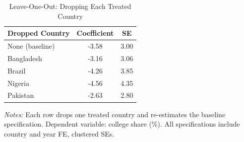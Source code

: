 \begin{table}[t]
\centering
\caption{Leave-One-Out: Dropping Each Treated Country}
\label{tab:loo}
\small
\begin{threeparttable}
\begin{tabular}{lcc}
\toprule
Dropped Country & Coefficient & SE \\
\midrule
None (baseline) & -3.58 & 3.00 \\
Bangladesh & -3.16 & 3.06 \\
Brazil & -4.26 & 3.85 \\
Nigeria & -4.56 & 4.35 \\
Pakistan & -2.63 & 2.80 \\
\bottomrule
\end{tabular}
\begin{tablenotes}[flushleft]
\small
\item \textit{Notes:} Each row drops one treated country and re-estimates the baseline specification. Dependent variable: college share (\%). All specifications include country and year FE, clustered SEs.
\end{tablenotes}
\end{threeparttable}
\end{table}

